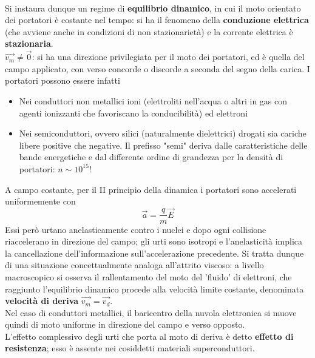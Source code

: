 \\Si instaura dunque un regime di \textbf{equilibrio dinamico}, in cui il moto orientato dei portatori è costante nel tempo: si ha il fenomeno della \textbf{conduzione elettrica} (che avviene anche in condizioni di non stazionarietà) e la corrente elettrica è \textbf{stazionaria}.
\\$\vec{v_m} \neq \vec{0}$: si ha una direzione privilegiata per il moto dei portatori, ed è quella del campo applicato, con verso concorde o discorde a seconda del segno della carica. I portatori possono essere infatti
\begin{itemize}
\item Nei conduttori non metallici ioni (elettroliti nell'acqua o altri in gas con agenti ionizzanti che favoriscano la conducibilità) ed elettroni
\item Nei semiconduttori, ovvero silici (naturalmente dielettrici) drogati sia cariche libere positive che negative. Il prefisso "semi" deriva dalle caratteristiche delle bande energetiche e dal differente ordine di grandezza per la densità di portatori: $n \sim 10^{15}$!
\end{itemize}
A campo costante, per il II principio della dinamica i portatori sono accelerati uniformemente con
\[\vec{a} = \frac{q}{m} \vec{E}\]
Essi però urtano anelasticamente contro i nuclei e dopo ogni collisione riaccelerano in direzione del campo; gli urti sono isotropi e l'anelasticità implica la cancellazione dell'informazione sull'accelerazione precedente. Si tratta dunque di una situazione concettualmente analoga all'attrito viscoso: a livello macroscopico si osserva il rallentamento del moto del 'fluido' di elettroni, che raggiunto l'equilibrio dinamico procede alla velocità limite costante, denominata \textbf{velocità di deriva} $\vec{v_m} = \vec{v_d}$.
\\Nel caso di conduttori metallici, il baricentro della nuvola elettronica si muove quindi di moto uniforme in direzione del campo e verso opposto.
\\L'effetto complessivo degli urti che porta al moto di deriva è detto \textbf{effetto di resistenza}; esso è assente nei cosiddetti materiali superconduttori.

